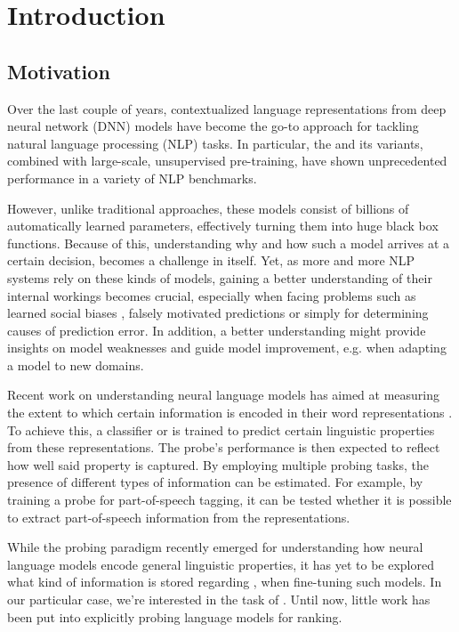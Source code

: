 \chapter{Introduction}
\section{Motivation}
Over the last couple of years, contextualized language representations from deep neural network (DNN) models have become the go-to approach for tackling natural language processing (NLP) tasks. In particular, the  \cite{vaswani2017attention} and its variants, combined with large-scale, unsupervised pre-training, have shown unprecedented performance in a variety of NLP benchmarks.

However, unlike traditional approaches, these models consist of billions of automatically learned parameters, effectively turning them into huge black box functions. Because of this, understanding why and how such a model arrives at a certain decision, becomes a challenge in itself. Yet, as more and more NLP systems rely on these kinds of models, gaining a better understanding of their internal workings becomes crucial, especially when facing problems such as learned social biases \cite{Nadeem2021StereoSetMS,Bender2021OnTD, kurita2019measuring}, falsely motivated predictions \cite{10.1145/2939672.2939778, DBLP:journals/corr/abs-1802-00614} or simply for determining causes of prediction error. In addition, a better understanding might provide insights on model weaknesses and guide model improvement, e.g. when adapting a model to new domains.

Recent work on understanding neural language models has aimed at measuring the extent to which certain information is encoded in their word representations \cite{tenney-etal-2019-bert,Tenney2019WhatDY,DBLP:journals/corr/abs-1909-03368}. To achieve this, a  classifier or  is trained to predict certain linguistic properties from these representations. The probe's performance is then expected to reflect how well said property is captured. By employing multiple probing tasks, the presence of different types of information can be estimated. For example, by training a probe for part-of-speech tagging, it can be tested whether it is possible to extract part-of-speech information from the representations.

While the probing paradigm recently emerged for understanding how neural language models encode general linguistic properties, it has yet to be explored what kind of information is stored regarding , when fine-tuning such models. In our particular case, we're interested in the task of . Until now, little work has been put into explicitly probing language models for ranking.

